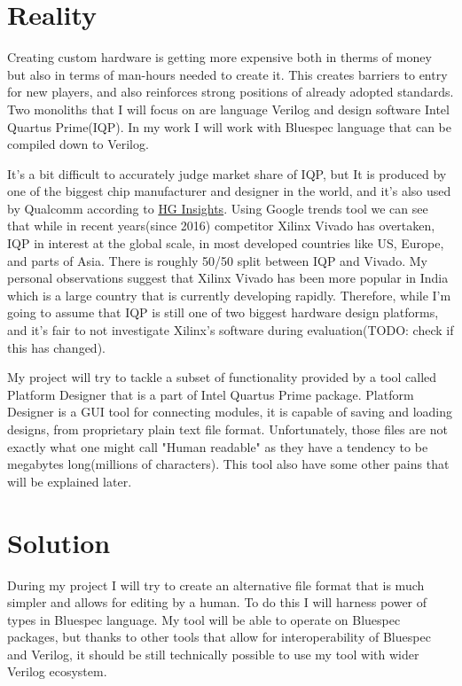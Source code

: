\documentclass[14pt]{report}
\begin{document}
\section{Reality}
Creating custom hardware is getting more expensive both in therms of money but also in terms of man-hours needed to create it. 
This creates barriers to entry for new players, and also reinforces strong positions of already adopted standards. 
Two monoliths that I will focus on are language Verilog and design software Intel Quartus Prime(IQP). 
In my work I will work with Bluespec language that can be compiled down to Verilog. 
\begin{tcolorbox}[title=Market share and justification for focusing entirely on comparisons with Intel Quartus Prime]
    It's a bit difficult to accurately judge market share of IQP, but It is produced by one of the biggest chip manufacturer and designer in the world, and it's also used by Qualcomm according to \href{https://discovery.hgdata.com/product/intel-quartus-prime}{HG Insights}. Using Google trends tool we can see that while in recent years(since 2016) competitor Xilinx Vivado has overtaken, IQP in interest at the global scale, in most developed countries like US, Europe, and parts of Asia. There is roughly 50/50 split between IQP and Vivado. My personal observations suggest that Xilinx Vivado has been more popular in India which is a large country that is currently developing rapidly. Therefore, while I'm going to assume that IQP is still one of two biggest hardware design platforms, and it's fair to not investigate Xilinx's software during evaluation(TODO: check if this has changed).
\end{tcolorbox}
My project will try to tackle a subset of functionality provided by a tool called Platform Designer that is a part of Intel Quartus Prime package. Platform Designer is a GUI tool for connecting modules, it is capable of saving and loading designs, from proprietary plain text file format. Unfortunately, those files are not exactly what one might call "Human readable" as they have a tendency to be megabytes long(millions of characters). This tool also have some other pains that will be explained later.

\section{Solution}
During my project I will try to create an alternative file format that is much simpler and allows for editing by a human. To do this I will harness power of types in Bluespec language. My tool will be able to operate on Bluespec packages, but thanks to other tools that allow for interoperability of Bluespec and Verilog, it should be still technically possible to use my tool with wider Verilog ecosystem.
\end{document}
